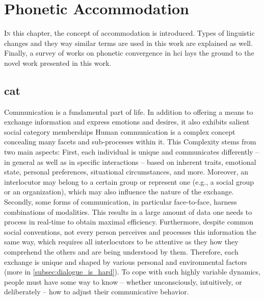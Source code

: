 \chapter{Phonetic Accommodation}
\label{chap:phonetic_convergence}

\lettrine{I}{n} this chapter, the concept of accommodation is introduced.
Types of linguistic changes and they way similar terms are used in this work are explained as well.
Finally, a survey of works on phonetic convergence in \acl{hci} lays the ground to the novel work presented in this work.

\pagebreak

\section{\Acl{cat}}
\label{sec:communication_accommodation_theory}

Communication is a fundamental part of life.
In addition to offering a means to exchange information and express emotions and desires, it also exhibits salient social category memberships
Human communication is a complex concept concealing many facets and sub-processes within it.
This Complexity stems from two main aspects:
First, each individual is unique and communicates differently -- in general as well as in specific interactions -- based on inherent traits, emotional state, personal preferences, situational circumstances, and more.
Moreover, an interlocutor may belong to a certain group or represent one (e.g., a social group or an organization), which may also influence the nature of the exchange.
Secondly, some forms of communication, in particular face-to-face, harness combinations of modalities.
This results in a large amount of data one needs to process in real-time to obtain maximal efficiency.
Furthermore, despite common social conventions, not every person perceives and processes this information the same way, which requires all interlocutors to be attentive as they how they comprehend the others and are being understood by them.
Therefore, each exchange is unique and shaped by various personal and environmental factors (more in \cref{subsec:dialogue_is_hard}).
To cope with such highly variable dynamics, people must have some way to know -- whether unconsciously, intuitively, or deliberately -- how to adjust their communicative behavior.

